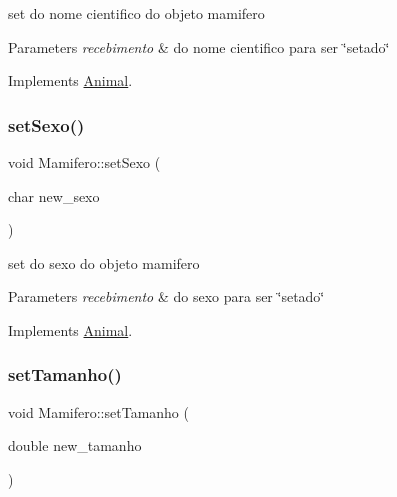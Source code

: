 set do nome cientifico do objeto mamifero 


\begin{DoxyParams}{Parameters}
{\em recebimento} & do nome cientifico para ser \char`\"{}setado\char`\"{} \\
\hline
\end{DoxyParams}


Implements \mbox{\hyperlink{class_animal}{Animal}}.

\mbox{\label{class_mamifero_a4daad134f55abaa51861dacae622563f}} 
\subsubsection{\texorpdfstring{setSexo()}{setSexo()}}
{\footnotesize\ttfamily void Mamifero\+::set\+Sexo (\begin{DoxyParamCaption}\item[{char}]{new\+\_\+sexo }\end{DoxyParamCaption})\hspace{0.3cm}{\ttfamily [virtual]}}



set do sexo do objeto mamifero 


\begin{DoxyParams}{Parameters}
{\em recebimento} & do sexo para ser \char`\"{}setado\char`\"{} \\
\hline
\end{DoxyParams}


Implements \mbox{\hyperlink{class_animal}{Animal}}.

\mbox{\label{class_mamifero_a945945661249935a96effebd8f8b2367}} 
\subsubsection{\texorpdfstring{setTamanho()}{setTamanho()}}
{\footnotesize\ttfamily void Mamifero\+::set\+Tamanho (\begin{DoxyParamCaption}\item[{double}]{new\+\_\+tamanho }\end{DoxyParamCaption})\hspace{0.3cm}{\ttfamily [virtual]}}



